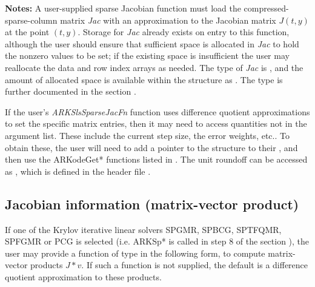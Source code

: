 \documentclass[letterpaper,10pt,english]{sphinxmanual}
\begin{document}
\begin{fulllineitems}
\textbf{Notes:} A user-supplied sparse Jacobian function must load the
compressed-sparse-column matrix \emph{Jac} with an approximation to the
Jacobian matrix \(J(t,y)\) at the point \((t,y)\).  Storage
for \emph{Jac} already exists on entry to this function, although the
user should ensure that sufficient space is allocated in \emph{Jac} to
hold the nonzero values to be set; if the existing space is
insufficient the user may reallocate the data and row index arrays
as needed.  The type of \emph{Jac} is , and the amount of
allocated space is available within the  structure as
. The  type is further documented in the section
{\hyperref[linear_solvers/index:linearsolvers]{\emph{}}}.

If the user's \emph{ARKSlsSparseJacFn} function uses difference quotient
approximations to set the specific matrix entries, then it may need
to access quantities not in the argument list.  These include the
current step size, the error weights, etc..  To obtain these, the
user will need to add a pointer to the  structure to
their , and then use the ARKodeGet* functions listed
in {\hyperref[c_interface/User_callable:cinterface-optionaloutputs]{\emph{}}}. The unit roundoff can be
accessed as , which is defined in the header
file .

\end{fulllineitems}



\subsection{Jacobian information (matrix-vector product)}
\label{c_interface/User_supplied:cinterface-jtimesfn}\label{c_interface/User_supplied:jacobian-information-matrix-vector-product}
If one of the Krylov iterative linear solvers SPGMR, SPBCG, SPTFQMR,
SPFGMR or PCG is selected (i.e. ARKSp* is called in step 8 of the
section {\hyperref[c_interface/Skeleton:cinterface-skeleton]{\emph{}}}), the user may provide a function
of type {\hyperref[c_interface/User_supplied:c.ARKSpilsJacTimesVecFn]{\emph{}}} in the following form, to
compute matrix-vector products \(J*v\). If such a function is not
supplied, the default is a difference quotient approximation to these
products.
\end{document}
